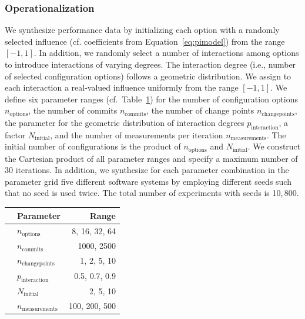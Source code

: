 \documentclass[sigconf]{acmart}
\begin{document}
	\subsubsection{Operationalization}
	We synthesize performance data by initializing each option with a randomly selected influence (cf. coefficients from Equation~\ref{eq:pimodel}) from the range $\left[-1,1 \right]$. In addition, we randomly select a number of interactions among options to introduce interactions of varying degrees. The interaction degree (i.e., number of selected configuration options) follows a geometric distribution. We assign to each interaction a real-valued influence uniformly from the range $[-1, 1]$. We define six parameter ranges (cf.~Table~\ref{tab:synthetic_experiment_ranges}) for the number of configuration options $n_\text{options}$, the number of commits $n_\text{commits}$, the number of change points $n_\text{changepoints}$, the parameter for the geometric distribution of interaction degrees $p_\text{interaction}$, a factor $N_\text{initial}$, and the number of measurements per iteration $n_\text{measurements}$. The initial number of configurations is the product of $n_\text{options}$ and $N_\text{initial}$. We construct the Cartesian product of all parameter ranges and specify a maximum number of 30 iterations. In addition, we synthesize for each parameter combination in the parameter grid five different software systems by employing different seeds such that no seed is used twice. The total number of experiments with seeds is 10,\,800.%
	
	\begin{table}
		\centering
		\label{tab:synthetic_experiment_ranges}
		\begin{tabular}{llr}
			\toprule
			\textbf{}                & \textbf{Parameter}        & \multicolumn{1}{r}{\textbf{Range}} \\
			\midrule
			\parbox[t]{20mm}{} & $n_\text{options}$                & 8, 16, 32, 64                \\
			& $n_\text{commits}$                & 1000, 2500                \\
			& $n_\text{changepoints}$           & 1, 2, 5, 10                        \\
			& $p_\text{interaction}$ & 0.5, 0.7, 0.9                     \\
			\midrule
			\parbox[t]{20mm}{}   & $N_\text{initial}$       & 2, 5, 10                           \\
			& $n_\text{measurements}$           & 100, 200, 500                      \\
			\bottomrule            
		\end{tabular}
	\end{table}
	
\end{document}
